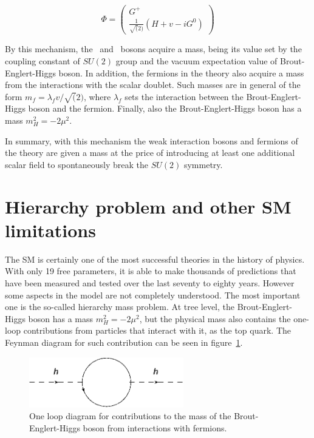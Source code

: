 \begin{equation}
  \label{eq:TransHiggsDoublet}
  \Phi=\left(
    \begin{array}{c}
      G^{+} \\
      \frac{1}{\sqrt(2)}(H+v-iG^{0})
    \end{array}
  \right)
\end{equation}

By this mechanism, the \W~and \Z~bosons acquire a mass, being its value set by the coupling constant of $SU(2)$ group and the vacuum expectation value of Brout-Englert-Higgs boson. In addition, the fermions in the theory also acquire a mass from the interactions with the scalar doublet. Such masses are in general of the form $m_{f}=\lambda_{f}v/\sqrt(2)$, where $\lambda_{f}$ sets the interaction between the Brout-Englert-Higgs boson and the fermion. Finally, also the Brout-Englert-Higgs boson has a mass $m_{H}^{2}=-2\mu^{2}$.

In summary, with this mechanism the weak interaction bosons and fermions of the theory are given a mass at the price of introducing at least one additional scalar field to spontaneously break the $SU(2)$ symmetry.

\section{Hierarchy problem and other SM limitations}
\label{sec:hier}

The SM is certainly one of the most successful theories in the history of physics. With only 19 free parameters, it is able to make thousands of predictions that have been measured and tested over the last seventy to eighty years. However some aspects in the model are not completely understood. The most important one is the so-called hierarchy mass problem. At tree level, the Brout-Englert-Higgs boson has a mass $m_{H}^{2}=-2\mu^{2}$, but the physical mass also contains the one-loop contributions from particles that interact with it, as the top quark. The Feynman diagram for such contribution can be seen in figure~\ref{fig:oneloophiggs}.

\begin{figure}[!Hhtbp]
  \begin{center}
    \includegraphics[width=0.6\textwidth]{figs/HierarchyLoop.png}
    \caption{One loop diagram for contributions to the mass of the Brout-Englert-Higgs boson from interactions with fermions.}
    \label{fig:oneloophiggs}
  \end{center}
\end{figure}


